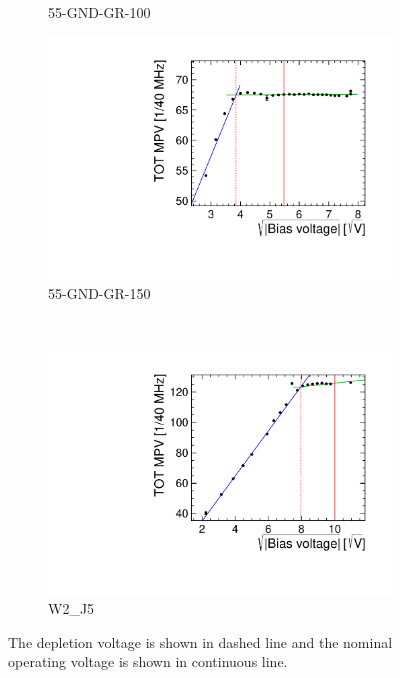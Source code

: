 \begin{figure}[htbp]
\begin{subfigure}[b]{0.33\textwidth}
    \caption{55-GND-GR-100}
  \end{subfigure}\hfill
  \begin{subfigure}[b]{0.33\textwidth}
    \includegraphics[width=\textwidth]{./figures/TestBeam/depletionVoltage_W0005_F01.pdf}
    \caption{55-GND-GR-150}
  \end{subfigure}\\
  \begin{subfigure}[b]{0.33\textwidth}
    \includegraphics[width=\textwidth]{./figures/TestBeam/depletionVoltage_W0002_J05.pdf}
    \caption{W2\_J5}
  \end{subfigure}
  \caption{The depletion voltage is shown in dashed line and the nominal operating voltage is shown in continuous line.}
  \label{fig:depletionVoltage}
\end{figure}


